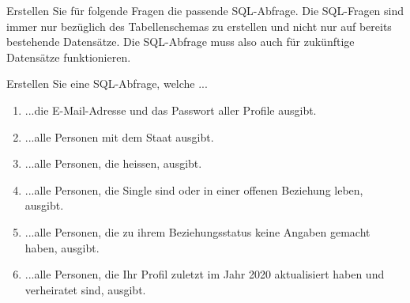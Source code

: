 Erstellen Sie für folgende Fragen die passende \ac{SQL}-Abfrage. Die \ac{SQL}-Fragen sind immer nur bezüglich des Tabellenschemas zu erstellen und nicht nur auf bereits bestehende Datensätze. Die \ac{SQL}-Abfrage muss also auch für zukünftige Datensätze funktionieren.

Erstellen Sie eine \ac{SQL}-Abfrage, welche ...

\begin{enumerate}
\item ...die E-Mail-Adresse und das Passwort aller Profile ausgibt.

\item ...alle Personen mit dem Staat  ausgibt.

\item ...alle Personen, die  heissen, ausgibt.

\item ...alle Personen, die Single sind oder in einer offenen Beziehung leben, ausgibt.

\item ...alle Personen, die zu ihrem Beziehungsstatus keine Angaben gemacht haben, ausgibt.

\item ...alle Personen, die Ihr Profil zuletzt im Jahr 2020 aktualisiert haben und verheiratet sind, ausgibt.

\end{enumerate}